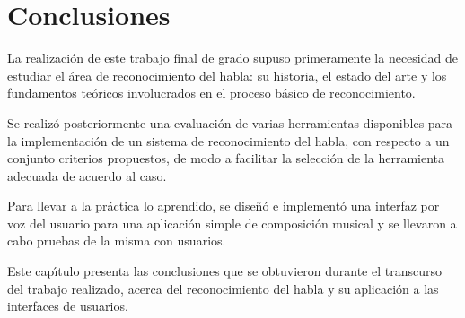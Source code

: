 \chapter{Conclusiones}
\label{sec:conclusiones}

La realizaci\'on de este trabajo final de grado supuso primeramente la necesidad de estudiar
el \'area de reconocimiento del habla: su historia, el estado del arte y los fundamentos
te\'oricos involucrados en el proceso b\'asico de reconocimiento.

Se realiz\'o posteriormente una evaluaci\'on de varias herramientas disponibles para la
implementaci\'on de un sistema de reconocimiento del habla, con respecto a un conjunto
criterios propuestos, de modo a facilitar la selecci\'on de la herramienta adecuada de
acuerdo al caso.

Para llevar a la pr\'actica lo aprendido, se dise\~n\'o e implement\'o una interfaz por voz
del usuario para una aplicaci\'on simple de composici\'on musical y se llevaron a cabo
pruebas de la misma con usuarios.

Este cap{\'\i}tulo presenta las conclusiones que se obtuvieron durante el transcurso
del trabajo realizado, acerca del reconocimiento del habla y su aplicaci\'on a las
interfaces de usuarios.






